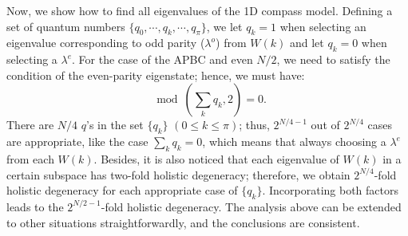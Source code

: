 \documentclass[twocolumn,floats,superscriptaddress]{revtex4}
\begin{document}
Now, we show how to find all eigenvalues of the 1D compass model. Defining a set of quantum numbers
$\{q_0,\cdots ,q_k ,\cdots,q_\pi\}$, we let $q_k=1$ when selecting an eigenvalue corresponding to odd parity ($\lambda^o$) from $W(k)$ and let $q_k=0$ when selecting a $\lambda^e$. {For the case of the APBC and even $N/2$}, we need to satisfy the condition of the even-parity eigenstate; hence, we must have:
\begin{equation}\label{Bsumq}
 \mod(\sum_k q_k,2)=0.
\end{equation}
There are $N/4$ $q$'s in the set $\{q_k\}$ $(0\leq k\leq\pi)$; thus, $2^{N/4-1}$ out of $2^{N/4}$ cases are appropriate, like the case $\sum_k q_k=0$, which means that {always} choosing a $\lambda^e$ from {each} $W(k)$. Besides, it is {also} noticed that each eigenvalue of $W(k)$ in a certain subspace has two-fold holistic degeneracy; therefore, we obtain $2^{N/4}$-fold holistic degeneracy for each appropriate case of $\{q_k\}$. {Incorporating} both factors leads to the $2^{N/2-1}$-fold holistic degeneracy. The analysis above can be extended to other situations straightforwardly, and the {conclusions are} consistent.


\end{document}
